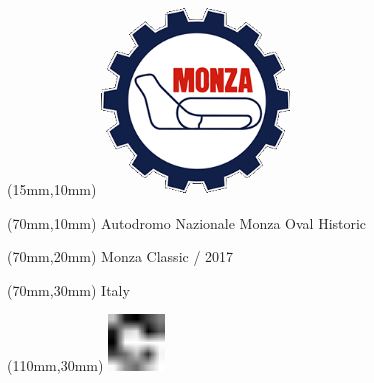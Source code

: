\null\newpage
\begin{textblock*}{50mm}(15mm,10mm)%
\includegraphics[width=50mm]{LG/MON.png}
\end{textblock*}
\begin{textblock*}{130mm}(70mm,10mm)%
{\fontsize{20}{20}\selectfont Autodromo Nazionale Monza Oval Historic}\\
\end{textblock*}
\begin{textblock*}{120mm}(70mm,20mm)%
{\fontsize{16}{16}\selectfont Monza Classic / 2017}\\
\end{textblock*}
\begin{textblock*}{120mm}(70mm,30mm)%
{\fontsize{12}{12}\selectfont Italy}
\end{textblock*}
\begin{textblock*}{30mm}(110mm,30mm)%
\centering
\includegraphics[height=15mm]{icons/fa-rotate-right.pdf}
\end{textblock*}
